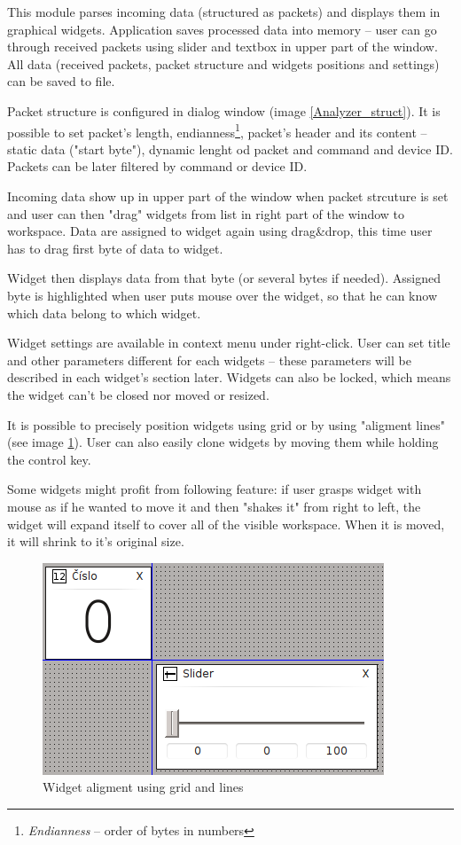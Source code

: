\documentclass[12pt, a4paper, oneside]{article}
\newcommand{\It}{\textit}  %
\begin{document}
This module parses incoming data (structured as packets) and displays them in graphical widgets. Application saves processed data into memory -- user can go through received packets using slider and textbox in upper part of the window. All data (received packets, packet structure and widgets positions and settings) can be saved to file. 

Packet structure is configured in dialog window (image \ref{Analyzer_struct}). It is possible to set packet's length, endianness\footnote{\It{Endianness} -- order of bytes in numbers}, packet's header and its content -- static data ("start byte"), dynamic lenght od packet and command and device ID. Packets can be later filtered by command or device ID.

\newpage
\setlength{\voffset}{0mm}
\pagestyle{plain}

Incoming data show up in upper part of the window when packet strcuture is set and user can then "drag" widgets from list in right part of the window to workspace. Data are assigned to widget again using drag\&drop, this time user has to drag first byte of data to widget.

Widget then displays data from that byte (or several bytes if needed). Assigned byte is highlighted when user puts mouse over the widget, so that he can know which data belong to which widget.

Widget settings are available in context menu under right-click. User can set title and other parameters different for each widgets -- these parameters will be described in each widget's section later. Widgets can also be locked, which means the widget can't be closed nor moved or resized.

It is possible to precisely position widgets using grid or by using "aligment lines" (see image \ref{widget_lines}). User can also easily clone widgets by moving them while holding the control key.

Some widgets might profit from following feature: if user grasps widget with mouse as if he wanted to move it and then "shakes it" from right to left, the widget will expand itself to cover all of the visible workspace. When it is moved, it will shrink to it's original size.

\begin{figure}[H]
\begin{center}
\includegraphics[scale=1]{img/lines.png}
\caption{Widget aligment using grid and lines}
\label{widget_lines}
\end{center}
\end{figure}
\end{document}
